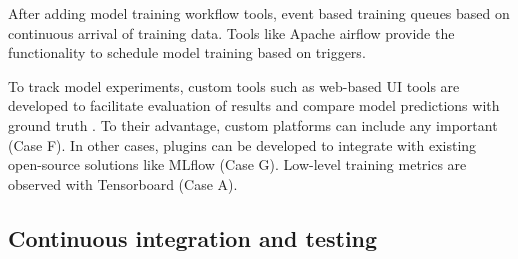 \DIFdelend After adding model training workflow tools, \DIFdelbegin {}\DIFdelend event based training queues \DIFdelbegin {}\DIFdelend \DIFaddbegin {}\DIFaddend based on continuous arrival of training data.  Tools like Apache airflow provide the functionality to schedule model training based on \DIFdelbegin {}\DIFdelend \DIFaddbegin {}\DIFaddend triggers. %

\DIFaddbegin 



\DIFaddend To track model experiments, custom tools such as web-based UI tools \DIFdelbegin {}\DIFdelend are developed to facilitate evaluation of results and compare model predictions with ground truth \DIFaddbegin {}\DIFaddend . To their advantage, custom platforms can include any \DIFdelbegin {}\DIFdelend \DIFaddbegin {}\DIFaddend important (Case F). In other cases, plugins can be developed to integrate with existing open-source solutions like MLflow (Case G). Low-level training metrics are observed with Tensorboard (Case A).

\subsection{Continuous integration and testing}

